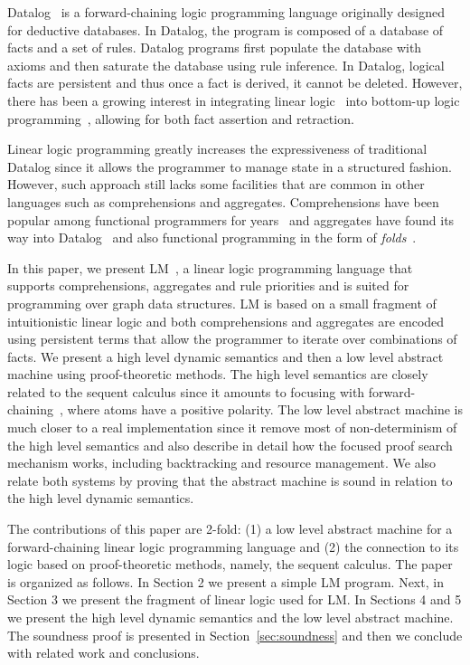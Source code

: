 
Datalog~\cite{Ramakrishnan93asurvey} is a forward-chaining logic programming
language originally designed for deductive databases. In Datalog, the program is
composed of a database of facts and a set of rules. Datalog programs first
populate the database with axioms and then saturate the database using rule
inference. In Datalog, logical facts are persistent and thus once a fact is
derived, it cannot be deleted. However, there has been a growing interest in
integrating linear logic~\cite{girard-87} into bottom-up logic
programming~\cite{Chang03ajudgmental,cruz-iclp14,Lopez:2005:MCL:1069774.1069778,simmons-lla},
allowing for both fact assertion and retraction.

Linear logic programming greatly increases the expressiveness of traditional
Datalog since it allows the programmer to manage state in a structured fashion.
However, such approach still lacks some facilities that are common in other
languages such as comprehensions and aggregates. Comprehensions have been
popular among functional programmers for years~\cite{npl1977} and aggregates
have found its way into
Datalog~\cite{Consens93lowcomplexity,Greco:1999:DPD:627321.627989} and also
functional programming in the form of
\emph{folds}~\cite{Hutton:1999:TUE:968578.968579}.

In this paper, we present LM~\cite{cruz-iclp14}, a linear logic programming
language that supports comprehensions, aggregates and rule priorities and is
suited for programming over graph data structures. LM is based on a small
fragment of intuitionistic linear logic and both comprehensions and aggregates
are encoded using persistent terms that allow the programmer to iterate over
combinations of facts. We present a high level dynamic semantics and then a low
level abstract machine using proof-theoretic methods. The high level semantics
are closely related to the sequent calculus since it amounts to focusing with
forward-chaining~\cite{Andreoli92logicprogramming,laurent2004proof}, where atoms
have a positive polarity.  The low level abstract machine is much closer to a
real implementation since it remove most of non-determinism of the high level
semantics and also describe in detail how the focused proof search mechanism
works, including backtracking and resource management. We also relate both
systems by proving that the abstract machine is sound in relation to the high
level dynamic semantics.

The contributions of this paper are 2-fold: (1) a low level abstract machine for
a forward-chaining linear logic programming language and (2) the connection to
its logic based on proof-theoretic methods, namely, the sequent calculus.  The
paper is organized as follows. In Section 2 we present a simple LM program.
Next, in Section 3 we present the fragment of linear logic used for LM. In
Sections 4 and 5 we present the high level dynamic semantics and the low level
abstract machine. The soundness proof is presented in
Section~\ref{sec:soundness} and then we conclude with related work and
conclusions.

